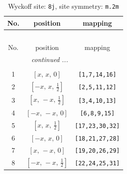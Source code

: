 \documentclass[fleqn,8pt]{jsarticle}
\begin{document}
\begin{longtable}{ccc}
\caption{Wyckoff site: {\tt 8j}, site symmetry: {\tt m.2m}}
 \\
 \hline \hline
No. & position & mapping \\ \hline \endfirsthead

\multicolumn{2}{l}{\tablename\ \thetable{}} \\
 \hline \hline
No. & position & mapping \\ \hline \endhead

 \hline \hline
\multicolumn{2}{r}{\footnotesize\it continued ...} \\ \endfoot

 \hline \hline
\multicolumn{2}{r}{} \\ \endlastfoot

1 & $\left[ x,\, x,\, 0 \right]$ & {\tt [1,7,14,16]} \\ \hline
2 & $\left[ - x,\, x,\, \frac{1}{2} \right]$ & {\tt [2,5,11,12]} \\ \hline
3 & $\left[ x,\, - x,\, \frac{1}{2} \right]$ & {\tt [3,4,10,13]} \\ \hline
4 & $\left[ - x,\, - x,\, 0 \right]$ & {\tt [6,8,9,15]} \\ \hline
5 & $\left[ x,\, x,\, \frac{1}{2} \right]$ & {\tt [17,23,30,32]} \\ \hline
6 & $\left[ - x,\, x,\, 0 \right]$ & {\tt [18,21,27,28]} \\ \hline
7 & $\left[ x,\, - x,\, 0 \right]$ & {\tt [19,20,26,29]} \\ \hline
8 & $\left[ - x,\, - x,\, \frac{1}{2} \right]$ & {\tt [22,24,25,31]} \\
\end{longtable}
\renewcommand{\arraystretch}{1.2}
\end{document}
